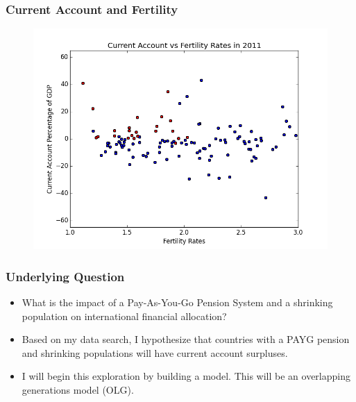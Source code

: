 \documentclass[11pt]{beamer}
\theoremstyle{definition}
\begin{document}
\begin{frame}
    \frametitle{Current Account and Fertility}
\begin{figure}
	\centering
\includegraphics[scale=0.5]{CA_Fert.png}
	\label{V4}
\end{figure}

\end{frame}

\begin{frame}
    \frametitle{Underlying Question}

    \begin{itemize}
        \item What is the impact of a Pay-As-You-Go Pension System and a shrinking population on international financial allocation?
        \item Based on my data search, I hypothesize that countries with a PAYG pension and shrinking populations will have current account surpluses.
        \item I will begin this exploration by building a model. This will be an overlapping generations model (OLG).

    \end{itemize}


\end{frame}

\end{document}
